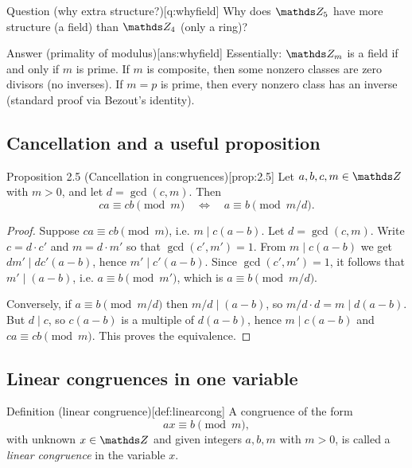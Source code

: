 \documentclass[10pt]{article}
\theoremstyle{definition}
\theoremstyle{plain}
\numberwithin{equation}{section}
\begin{document}
\begin{define}{Question (why extra structure?)}[q:whyfield]
Why does $\setZ_5$ have more structure (a field) than $\setZ_4$ (only a ring)?
\end{define}

\begin{define}{Answer (primality of modulus)}[ans:whyfield]
Essentially: $\setZ_m$ is a field if and only if $m$ is prime. If $m$ is composite,
then some nonzero classes are zero divisors (no inverses). If $m=p$ is prime, then
every nonzero class has an inverse (standard proof via Bezout's identity).
\end{define}

\subsection*{Cancellation and a useful proposition}

\begin{define}{Proposition 2.5 (Cancellation in congruences)}[prop:2.5]
Let $a,b,c,m\in\setZ$ with $m>0$, and let $d=\gcd(c,m)$. Then
\[
ca\equiv cb\pmod{m}\quad\Longleftrightarrow\quad a\equiv b\pmod{m/d}.
\]
\end{define}

\begin{proof}
Suppose $ca\equiv cb\pmod{m}$, i.e. $m\mid c(a-b)$. Let $d=\gcd(c,m)$. Write $c=d\cdot c'$
and $m=d\cdot m'$ so that $\gcd(c',m')=1$. From $m\mid c(a-b)$ we get $d m'\mid d c'(a-b)$,
hence $m'\mid c'(a-b)$. Since $\gcd(c',m')=1$, it follows that $m'\mid (a-b)$, i.e.
$a\equiv b\pmod{m'}$, which is $a\equiv b\pmod{m/d}$.

Conversely, if $a\equiv b\pmod{m/d}$ then $m/d\mid (a-b)$, so $m/d\cdot d = m \mid d(a-b)$.
But $d\mid c$, so $c(a-b)$ is a multiple of $d(a-b)$, hence $m\mid c(a-b)$ and
$ca\equiv cb\pmod{m}$. This proves the equivalence.
\end{proof}

\subsection*{Linear congruences in one variable}

\begin{define}{Definition (linear congruence)}[def:linearcong]
A congruence of the form
\[
ax\equiv b\pmod{m},
\]
with unknown $x\in\setZ$ and given integers $a,b,m$ with $m>0$, is called a
\emph{linear congruence} in the variable $x$.
\end{define}
\end{document}
